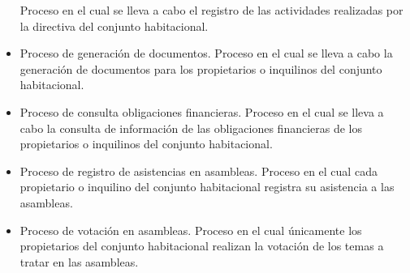 \begin{itemize}
    Proceso en el cual se lleva a cabo el registro de las actividades realizadas por la directiva del conjunto habitacional.
    \item Proceso de generación de documentos.
    Proceso en el cual se lleva a cabo la generación de documentos para los propietarios o inquilinos del conjunto habitacional.
    \item Proceso de consulta obligaciones financieras.
    Proceso en el cual se lleva a cabo la consulta de información de las obligaciones financieras de los propietarios o inquilinos del conjunto habitacional.
    \item Proceso de registro de asistencias en asambleas.
    Proceso en el cual cada propietario o inquilino del conjunto habitacional registra su asistencia a las asambleas.
    \item Proceso de votación en asambleas.
    Proceso en el cual únicamente los propietarios del conjunto habitacional realizan la votación de los temas a tratar en las asambleas.
\end{itemize}

